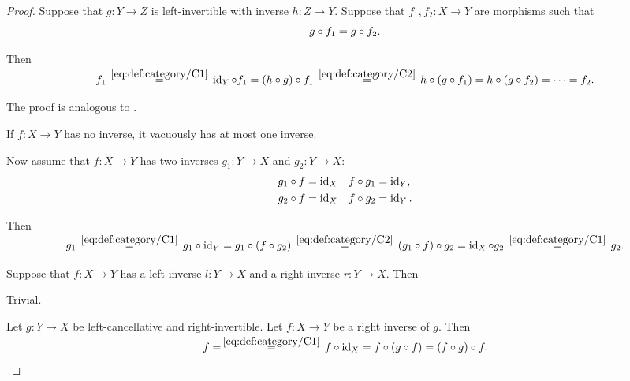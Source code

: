 \begin{proof}
   Suppose that \( g: Y \to Z \) is left-invertible with inverse \( h: Z \to Y \). Suppose that \( f_1, f_2: X \to Y \) are morphisms such that
  \begin{equation*}
    g \bincirc f_1 = g \bincirc f_2.
  \end{equation*}

  Then
  \begin{equation*}
    f_1
    \reloset {\eqref{eq:def:category/C1}} =
    \id_Y \bincirc f_1
    =
    (h \bincirc g) \bincirc f_1
    \reloset {\eqref{eq:def:category/C2}} =
    h \bincirc (g \bincirc f_1)
    =
    h \bincirc (g \bincirc f_2)
    =
    \cdots
    =
    f_2.
  \end{equation*}

   The proof is analogous to .

   If \( f: X \to Y \) has no inverse, it vacuously has at most one inverse.

  Now assume that \( f: X \to Y \) has two inverses \( g_1: Y \to X \) and \( g_2: Y \to X \):
  \begin{align*}
    g_1 \bincirc f = \id_X &&& f \bincirc g_1 = \id_Y, \\
    g_2 \bincirc f = \id_X &&& f \bincirc g_2 = \id_Y.
  \end{align*}

  Then
  \begin{equation*}
    g_1
    \reloset {\eqref{eq:def:category/C1}} =
    g_1 \bincirc \id_Y
    =
    g_1 \bincirc (f \bincirc g_2)
    \reloset {\eqref{eq:def:category/C2}} =
    (g_1 \bincirc f) \bincirc g_2
    =
    \id_X \bincirc g_2
    \reloset {\eqref{eq:def:category/C1}} =
    g_2.
  \end{equation*}

   Suppose that \( f: X \to Y \) has a left-inverse \( l: Y \to X \) and a right-inverse \( r: Y \to X \). Then

   Trivial.

   Let \( g: Y \to X \) be left-cancellative and right-invertible. Let \( f: X \to Y \) be a right inverse of \( g \). Then
  \begin{equation*}
    f
    =
    \reloset {\eqref{eq:def:category/C1}} =
    f \bincirc \id_X
    =
    f \bincirc (g \bincirc f)
    =
    (f \bincirc g) \bincirc f.
  \end{equation*}


\end{proof}
